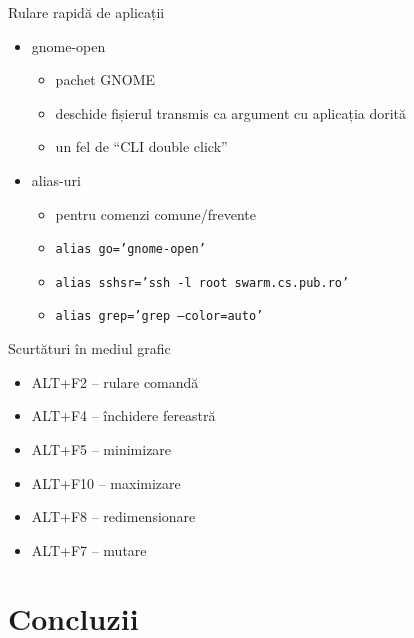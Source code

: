 \documentclass{beamer}
\begin{document}
\begin{frame}{Rulare rapidă de aplicații}
	\begin{itemize}
		\item gnome-open
			\begin{itemize}
				\item pachet GNOME
				\item deschide fișierul transmis ca argument cu aplicația
				dorită
				\item un fel de ``CLI double click''
			\end{itemize}
		\item alias-uri
			\begin{itemize}
				\item pentru comenzi comune/frevente
				\item \texttt{alias go='gnome-open'}
				\item \texttt{alias sshsr='ssh -l root swarm.cs.pub.ro'}
				\item \texttt{alias grep='grep --color=auto'}
			\end{itemize}
	\end{itemize}
\end{frame}

\begin{frame}{Scurtături în mediul grafic}
	\begin{itemize}
		\item ALT+F2 -- rulare comandă
		\item ALT+F4 -- închidere fereastră
		\item ALT+F5 -- minimizare
		\item ALT+F10 -- maximizare
		\item ALT+F8 -- redimensionare
		\item ALT+F7 -- mutare
	\end{itemize}
\end{frame}

\section{Concluzii}
\end{document}
